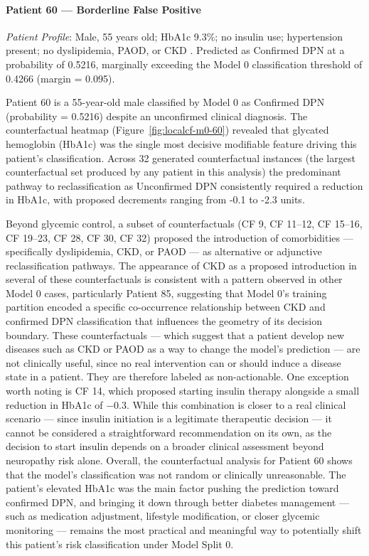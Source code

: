 \documentclass[pdflatex,sn-vancouver-num]{sn-jnl}
\begin{document}
\paragraph{Patient 60 --- Borderline False Positive}
\textit{Patient Profile}: Male, 55 years old; HbA1c 9.3\%; no insulin use; hypertension present; no dyslipidemia, PAOD, or CKD . Predicted as Confirmed DPN at a probability of 0.5216, marginally exceeding the Model 0 classification threshold of 0.4266 (margin = 0.095).

Patient 60 is a 55-year-old male classified by Model 0 as Confirmed DPN (probability = 0.5216) despite an unconfirmed clinical diagnosis.  The counterfactual heatmap (Figure~\ref{fig:localcf-m0-60}) revealed that glycated hemoglobin (HbA1c) was the single most decisive modifiable feature driving this patient's classification. Across 32 generated counterfactual instances (the largest counterfactual set produced by any patient in this analysis)  the predominant pathway to reclassification as Unconfirmed DPN consistently required a reduction in HbA1c, with proposed decrements ranging from -0.1 to -2.3 units. 


Beyond glycemic control, a subset of counterfactuals (CF 9, CF 11–12, CF 15–16, CF 19–23, CF 28, CF 30, CF 32) proposed the introduction of comorbidities --- specifically dyslipidemia, CKD, or PAOD — as alternative or adjunctive reclassification pathways. The appearance of CKD as a proposed introduction in several of these counterfactuals is consistent with a pattern observed in other Model 0 cases, particularly Patient 85, suggesting that Model 0's training partition encoded a specific co-occurrence relationship between CKD and confirmed DPN classification that influences the geometry of its decision boundary. These counterfactuals — which suggest that a patient develop new diseases such as CKD or PAOD as a way to change the model's prediction — are not clinically useful, since no real intervention can or should induce a disease state in a patient. They are therefore labeled as non-actionable. One exception worth noting is CF 14, which proposed starting insulin therapy alongside a small reduction in HbA1c of −0.3. While this combination is closer to a real clinical scenario — since insulin initiation is a legitimate therapeutic decision — it cannot be considered a straightforward recommendation on its own, as the decision to start insulin depends on a broader clinical assessment beyond neuropathy risk alone. Overall, the counterfactual analysis for Patient 60 shows that the model's classification was not random or clinically unreasonable. The patient's elevated HbA1c was the main factor pushing the prediction toward confirmed DPN, and bringing it down through better diabetes management — such as medication adjustment, lifestyle modification, or closer glycemic monitoring — remains the most practical and meaningful way to potentially shift this patient's risk classification under Model Split 0.
\end{document}
